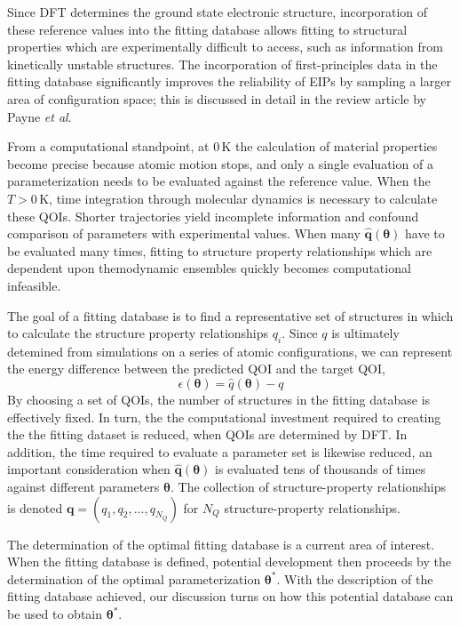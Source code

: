 Since DFT determines the ground state electronic structure, incorporation of these reference values into the fitting database allows fitting to structural properties which are experimentally difficult to access, such as information from kinetically unstable structures.  The incorporation of first-principles data in the fitting database significantly improves the reliability of EIPs by sampling a larger area of configuration space; this is discussed in detail in the review article by Payne \emph{et al}.\cite{payne1996_dft_database}

From a computational standpoint, at $0 \,\mathrm{K}$  the calculation of material properties become precise because atomic motion stops, and only a single evaluation of a parameterization needs to be evaluated against the reference value.  When the $T>0 \,\mathrm{K}$, time integration through molecular dynamics is necessary to calculate these QOIs.  Shorter trajectories yield incomplete information and confound comparison of parameters with experimental values.  When many $\hat{\bm{q}}(\bm{\theta})$ have to be evaluated many times, fitting to structure property relationships which are dependent upon themodynamic ensembles quickly becomes computational infeasible.

The goal of a fitting database is to find a representative set of structures in which to calculate the structure property relationships $q_i$.  Since $q$ is ultimately detemined from simulations on a series of atomic configurations, we can represent the energy difference between the predicted QOI and the target QOI,
\begin{equation}
	\epsilon(\bm{\theta})=\hat{q}(\bm{\theta})-q
\end{equation}
By choosing a set of QOIs, the number of structures in the fitting database is effectively fixed.  In turn, the the computational investment required to creating the the fitting dataset is reduced, when QOIs are determined by DFT.  In addition, the time required to evaluate a parameter set is likewise reduced, an important consideration when $\hat{\bm{q}}(\bm{\theta})$ is evaluated tens of thousands of times against different parameters $\bm{\theta}$.  The collection of structure-property relationships is denoted $\bm{q}=(q_1,q_2,...,q_{N_Q})$ for $N_Q$ structure-property relationships.

The determination of the optimal fitting database is a current area of interest\cite{zhang2015_bayes_fitttingdb}.  When the fitting database is defined, potential development then proceeds by the determination of the optimal parameterization $\bm{\theta}^*$.  With the description of the fitting database achieved, our discussion turns on how this potential database can be used to obtain $\bm{\theta}^*$.

